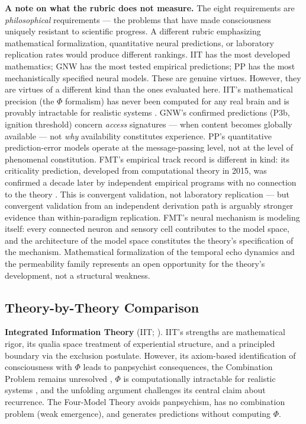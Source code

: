 \documentclass[12pt]{article}
\newcommand{\revstart}{}
\newcommand{\revend}{}
\begin{document}
{\revstart \textbf{A note on what the rubric does not measure.} The eight requirements are \emph{philosophical} requirements --- the problems that have made consciousness uniquely resistant to scientific progress. A different rubric emphasizing mathematical formalization, quantitative neural predictions, or laboratory replication rates would produce different rankings. IIT has the most developed mathematics; GNW has the most tested empirical predictions; PP has the most mechanistically specified neural models. These are genuine virtues. However, they are virtues of a different kind than the ones evaluated here. IIT's mathematical precision (the $\Phi$ formalism) has never been computed for any real brain and is provably intractable for realistic systems \citep{Aaronson2014}. GNW's confirmed predictions (P3b, ignition threshold) concern \emph{access} signatures --- when content becomes globally available --- not \emph{why} availability constitutes experience. PP's quantitative prediction-error models operate at the message-passing level, not at the level of phenomenal constitution. FMT's empirical track record is different in kind: its criticality prediction, developed from computational theory in 2015, was confirmed a decade later by independent empirical programs with no connection to the theory \citep{HengenShew2025,AlgomShriki2026,Toker2026}. This is convergent validation, not laboratory replication --- but convergent validation from an independent derivation path is arguably stronger evidence than within-paradigm replication. FMT's neural mechanism is modeling itself: every connected neuron and sensory cell contributes to the model space, and the architecture of the model space constitutes the theory's specification of the mechanism. Mathematical formalization of the temporal echo dynamics and the permeability family represents an open opportunity for the theory's development, not a structural weakness.\revend}


\subsection{Theory-by-Theory Comparison}


\textbf{Integrated Information Theory} (IIT; \citealp{Tononi2004,Albantakis2023}). IIT's strengths are mathematical rigor, its qualia space treatment of experiential structure, and a principled boundary via the exclusion postulate. However, its axiom-based identification of consciousness with $\Phi$ leads to panpsychist consequences, the Combination Problem remains unresolved \citep{Chalmers2016}, $\Phi$ is computationally intractable for realistic systems \citep{Aaronson2014}, and the unfolding argument \citep{Doerig2019} challenges its central claim about recurrence. The Four-Model Theory avoids panpsychism, has no combination problem (weak emergence), and generates predictions without computing $\Phi$.
\end{document}
